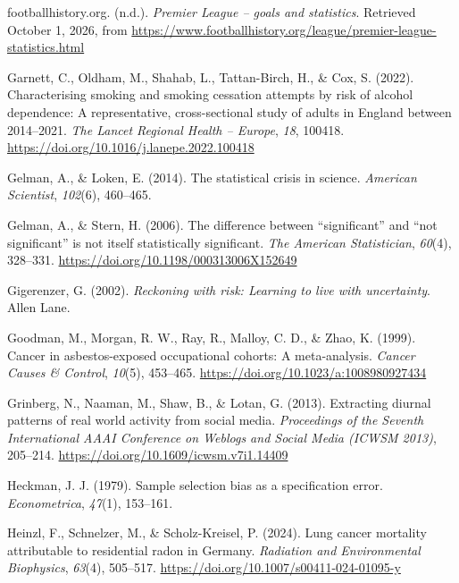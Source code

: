 \documentclass[
]{book}
\newlength{\cslhangindent}
\newenvironment{CSLReferences}[2] %
 {\begin{list}{}{%
  \setlength{\itemindent}{0pt}
  \setlength{\leftmargin}{0pt}
  \setlength{\parsep}{0pt}
  \ifodd #1
   \setlength{\leftmargin}{\cslhangindent}
   \setlength{\itemindent}{-1\cslhangindent}
  \fi
  \setlength{\itemsep}{#2\baselineskip}}}
 {\end{list}}
\begin{document}
\begin{CSLReferences}{1}{0}
{footballhistory.org}. (n.d.). \emph{{Premier} {League} -- goals and statistics}. Retrieved October 1, 2026, from \url{https://www.footballhistory.org/league/premier-league-statistics.html}

Garnett, C., Oldham, M., Shahab, L., Tattan-Birch, H., \& Cox, S. (2022). Characterising smoking and smoking cessation attempts by risk of alcohol dependence: A representative, cross-sectional study of adults in {England} between 2014--2021. \emph{The Lancet Regional Health -- Europe}, \emph{18}, 100418. \url{https://doi.org/10.1016/j.lanepe.2022.100418}

Gelman, A., \& Loken, E. (2014). The statistical crisis in science. \emph{American Scientist}, \emph{102}(6), 460--465.

Gelman, A., \& Stern, H. (2006). The difference between {``significant''} and {``not significant''} is not itself statistically significant. \emph{The American Statistician}, \emph{60}(4), 328--331. \url{https://doi.org/10.1198/000313006X152649}

Gigerenzer, G. (2002). \emph{Reckoning with risk: Learning to live with uncertainty}. Allen Lane.

Goodman, M., Morgan, R. W., Ray, R., Malloy, C. D., \& Zhao, K. (1999). Cancer in asbestos-exposed occupational cohorts: A meta-analysis. \emph{Cancer Causes \& Control}, \emph{10}(5), 453--465. \url{https://doi.org/10.1023/a:1008980927434}

Grinberg, N., Naaman, M., Shaw, B., \& Lotan, G. (2013). Extracting diurnal patterns of real world activity from social media. \emph{Proceedings of the Seventh International AAAI Conference on Weblogs and Social Media (ICWSM 2013)}, 205--214. \url{https://doi.org/10.1609/icwsm.v7i1.14409}

Heckman, J. J. (1979). Sample selection bias as a specification error. \emph{Econometrica}, \emph{47}(1), 153--161.

Heinzl, F., Schnelzer, M., \& Scholz-Kreisel, P. (2024). Lung cancer mortality attributable to residential radon in {Germany}. \emph{Radiation and Environmental Biophysics}, \emph{63}(4), 505--517. \url{https://doi.org/10.1007/s00411-024-01095-y}


\end{CSLReferences}
\end{document}
